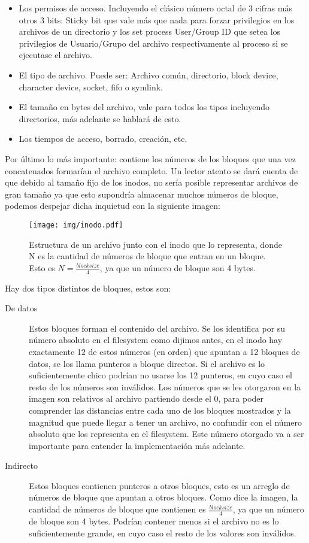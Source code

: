 \begin{itemize}
\item Los permisos de acceso. Incluyendo el clásico número octal de 3 cifras más otros 3 bits: Sticky bit que vale más que nada para forzar privilegios en los archivos de un directorio y los set process User/Group ID que setea los privilegios de Usuario/Grupo del archivo respectivamente al proceso si se ejecutase el archivo.
\item El tipo de archivo. Puede ser: Archivo común, directorio, block device, character device, socket, fifo o symlink.
\item El tamaño en bytes del archivo, vale para todos los tipos incluyendo directorios, más adelante se hablará de esto.
\item Los tiempos de acceso, borrado, creación, etc.
\end{itemize}

Por último lo más importante: contiene los números de los bloques que una vez concatenados formarían el archivo completo. Un lector atento se dará cuenta de que debido al tamaño fijo de los inodos, no sería posible representar archivos de gran tamaño ya que esto supondría almacenar muchos números de bloque, podemos despejar dicha inquietud con la siguiente imagen:

\begin{figure}
 \centering
 \texttt{[image: img/inodo.pdf]}
 \caption{Estructura de un archivo junto con el inodo que lo representa, donde N es la cantidad de números de bloque que entran en un bloque. Esto es $N = \frac{block size}4$, ya que un número de bloque son 4 bytes.}
\end{figure}

\pagebreak

Hay dos tipos distintos de bloques, estos son:

\begin{description}
\item[De datos] Estos bloques forman el contenido del archivo. Se los identifica por su número absoluto en el filesystem como dijimos antes, en el inodo hay exactamente 12 de estos números (en orden) que apuntan a 12 bloques de datos, se los llama punteros a bloque directos. Si el archivo es lo suficientemente chico podrían no usarse los 12 punteros, en cuyo caso el resto de los números son inválidos. Los números que se les otorgaron en la imagen son relativos al archivo partiendo desde el 0, para poder comprender las distancias entre cada uno de los bloques mostrados y la magnitud que puede llegar a tener un archivo, no confundir con el número absoluto que los representa en el filesystem. Este número otorgado va a ser importante para entender la implementación más adelante.
\item[Indirecto] Estos bloques contienen punteros a otros bloques, esto es un arreglo de números de bloque que apuntan a otros bloques.
  Como dice la imagen, la cantidad de números de bloque que contienen es $\frac{block size}{4}$, ya que un número de bloque son 4 bytes. Podrían contener menos si el archivo no es lo suficientemente grande, en cuyo caso el resto de los valores son inválidos.
\end{description}

